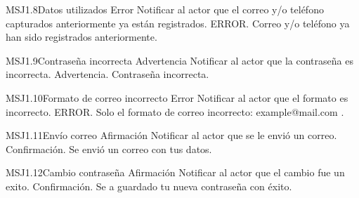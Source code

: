 	\begin{Message}{MSJ1.8}{Datos utilizados}
		\MSGitem[Tipo:] Error
		\MSGitem[Objetivo: ] Notificar al actor que el correo y/o teléfono capturados anteriormente ya están registrados.
		\MSGitem[Redacción: ] ERROR. Correo y/o teléfono ya han sido registrados anteriormente.
	\end{Message}

	\begin{Message}{MSJ1.9}{Contraseña incorrecta}
		\MSGitem[Tipo:] Advertencia
		\MSGitem[Objetivo: ] Notificar al actor que la contraseña es incorrecta.
		\MSGitem[Redacción: ] Advertencia. Contraseña incorrecta.
	\end{Message}

	\begin{Message}{MSJ1.10}{Formato de correo incorrecto}
	\MSGitem[Tipo:] Error
	\MSGitem[Objetivo: ] Notificar al actor que el formato es incorrecto.
	\MSGitem[Redacción: ] ERROR. Solo el formato de correo incorrecto: example@mail.com .
	\end{Message}

	\begin{Message}{MSJ1.11}{Envío correo}
	\MSGitem[Tipo:] Afirmación
	\MSGitem[Objetivo: ] Notificar al actor que se le envió un correo.
	\MSGitem[Redacción: ] Confirmación. Se envió un correo con tus datos. 
	\end{Message}
	
		\begin{Message}{MSJ1.12}{Cambio contraseña}
	\MSGitem[Tipo:] Afirmación
	\MSGitem[Objetivo: ] Notificar al actor que el cambio fue un exito.
	\MSGitem[Redacción: ] Confirmación. Se a guardado tu nueva contraseña con éxito. 
	\end{Message}